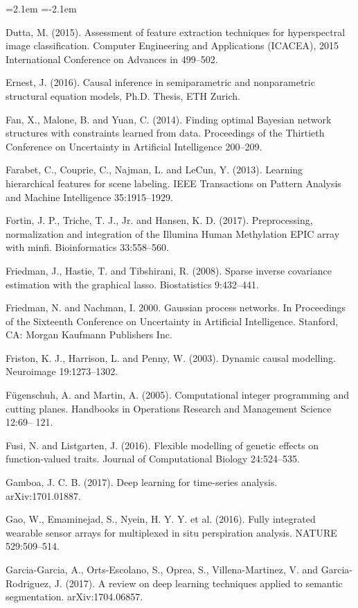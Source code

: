 \begin{list}{}{\leftmargin=2.1em  
  \itemindent=-2.1em \parsep=0pt \itemsep=2pt \topsep=0pt}
\item Dutta, M. (2015). Assessment of feature extraction techniques for hyperspectral image classification. Computer Engineering and Applications (ICACEA), 2015 International Conference on Advances in 499--502.
\item Ernest, J. (2016). Causal inference in semiparametric and nonparametric structural equation models, Ph.D. Thesis, ETH Zurich.
\item Fan, X., Malone, B. and Yuan, C. (2014). Finding optimal Bayesian network structures with constraints learned from data. Proceedings of the Thirtieth Conference on Uncertainty in Artificial Intelligence 200--209.
\item Farabet, C., Couprie, C., Najman, L. and LeCun, Y. (2013). Learning hierarchical features for scene labeling. IEEE Transactions on Pattern Analysis and Machine Intelligence 35:1915--1929.
\item Fortin, J. P., Triche, T. J., Jr. and Hansen, K. D. (2017). Preprocessing, normalization and integration of the Illumina Human Methylation EPIC array with minfi. Bioinformatics 33:558--560.
\item Friedman, J., Hastie, T. and Tibshirani, R. (2008). Sparse inverse covariance estimation with the graphical lasso. Biostatistics 9:432--441.
\item Friedman, N. and Nachman, I. 2000. Gaussian process networks. In Proceedings of the Sixteenth Conference on Uncertainty in Artificial Intelligence. Stanford, CA: Morgan Kaufmann Publishers Inc.
\item Friston, K. J., Harrison, L. and Penny, W. (2003). Dynamic causal modelling. Neuroimage 19:1273--1302.
\item Fügenschuh, A. and Martin, A. (2005). Computational integer programming and cutting planes. Handbooks in Operations Research and Management Science 12:69-- 121.
\item Fusi, N. and Listgarten, J. (2016). Flexible modelling of genetic effects on function-valued traits. Journal of Computational Biology 24:524--535.
\item Gamboa, J. C. B. (2017). Deep learning for time-series analysis. arXiv:1701.01887.
\item Gao, W., Emaminejad, S., Nyein, H. Y. Y. et al. (2016). Fully integrated wearable sensor arrays for multiplexed in situ perspiration analysis. NATURE 529:509--514.
\item Garcia-Garcia, A., Orts-Escolano, S., Oprea, S., Villena-Martinez, V. and Garcia-Rodriguez, J. (2017). A review on deep learning techniques applied to semantic segmentation. arXiv:1704.06857.

\end{list}
